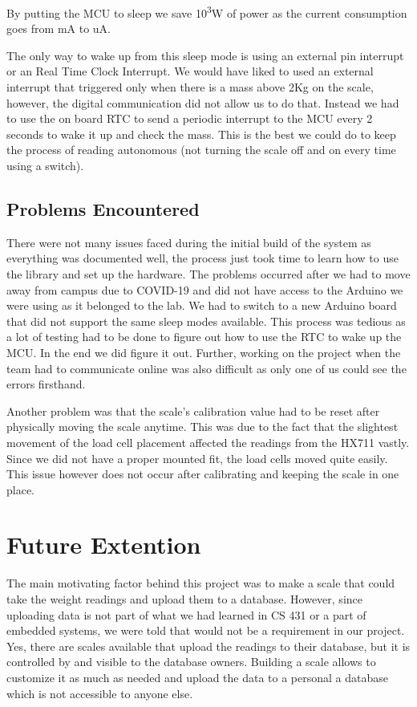 \documentclass[letterpaper,11pt]{article}
\begin{document}
By putting the MCU to sleep we save 10\textsuperscript{3}W of power as the
current consumption goes from mA to uA.

The only way to wake up from this sleep mode is using an external pin interrupt
or an Real Time Clock Interrupt. We would have liked to used an external
interrupt that triggered only when there is a mass above 2Kg on the scale,
however, the digital communication did not allow us to do that. Instead we had
to use the on board RTC to send a periodic interrupt to the MCU every 2 seconds
to wake it up and check the mass. This is the best we could do to keep the
process of reading autonomous (not turning the scale off and on every time using
a switch).


\subsection{Problems Encountered}

There were not many issues faced during the initial build of the system as
everything was documented well, the process just took time to learn how to use
the library and set up the hardware. The problems occurred after we had to move
away from campus due to COVID-19 and did not have access to the Arduino we were
using as it belonged to the lab. We had to switch to a new Arduino board that
did not support the same sleep modes available. This process was tedious as a
lot of testing had to be done to figure out how to use the RTC to wake up the
MCU. In the end we did figure it out. Further, working on the project when the
team had to communicate online was also difficult as only one of us could see
the errors firsthand.

Another problem was that the scale's calibration value had to be reset after
physically moving the scale anytime. This was due to the fact that the slightest
movement of the load cell placement affected the readings from the HX711
vastly. Since we did not have a proper mounted fit, the load cells moved quite
easily. This issue however does not occur after calibrating and keeping the
scale in one place.

\section{Future Extention}
The main motivating factor behind this project was to make a scale that could
take the weight readings and upload them to a database. However, since uploading
data is not part of what we had learned in CS 431 or a part of embedded systems,
we were told that would not be a requirement in our project. Yes, there are
scales available that upload the readings to their database, but it is
controlled by and visible to the database owners. Building a scale allows to
customize it as much as needed and upload the data to a personal a database
which is not accessible to anyone else.
\end{document}
